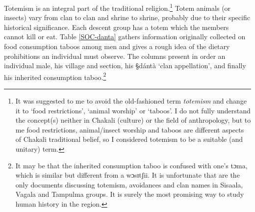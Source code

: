Totemism is an integral part of the traditional
religion.\footnote{It was suggested to me to avoid the old-fashioned term
{\it totemism} and change it to `food restrictions', `animal worship' or
`taboos'. I do not fully understand the concept(s) neither in Chakali (culture)
or  the field of anthropology, but  to me food restrictions, animal/insect
worship and taboos are different aspects of Chakali traditional belief,  so I
considered totemism to be a suitable (and unitary) term.} Totem animals
(or
insects) vary from clan to clan and shrine to shrine, probably due to their
specific historical significance. Each descent group has a totem which the
members cannot kill or eat. Table \ref{SOC-danta} gathers information originally
collected on food consumption taboos among men and gives a rough idea of  the dietary prohibitions an
individual  must observe.  The columns present in order an
individual male,  his village and section, his  {\S dántà} `clan appellation',
 and finally his inherited consumption taboo.\footnote{It may be that the
inherited consumption taboo is confused with one's {\F tɔma}, which is similar
but different from a {\F wɔsɪtʃii}. It is unfortunate that \cite{Ratt32a,
Ratt32b} are the only documents  discussing totemism, avoidances and clan names
in Sisaala, Vagala and Tampulma groups. It is surely the most promising way to
study human history in the region.}



